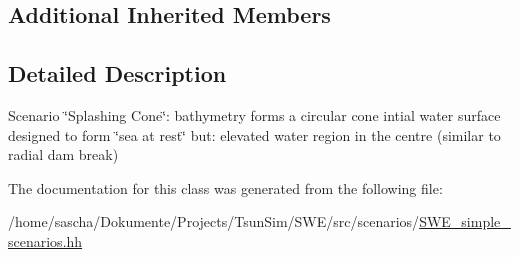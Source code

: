 \subsection*{Additional Inherited Members}


\subsection{Detailed Description}
Scenario \char`\"{}\-Splashing Cone\char`\"{}\-: bathymetry forms a circular cone intial water surface designed to form \char`\"{}sea at rest\char`\"{} but\-: elevated water region in the centre (similar to radial dam break) 

The documentation for this class was generated from the following file\-:\begin{DoxyCompactItemize}
\item 
/home/sascha/\-Dokumente/\-Projects/\-Tsun\-Sim/\-S\-W\-E/src/scenarios/\hyperlink{SWE__simple__scenarios_8hh}{S\-W\-E\-\_\-simple\-\_\-scenarios.\-hh}\end{DoxyCompactItemize}
